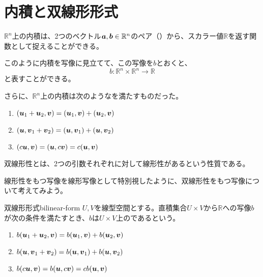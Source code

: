 \documentclass[../../../topic_linear-algebra]{subfiles}
\begin{document}
\sectionline
\section{内積と双線形形式}

$\mathbb{R}^n$上の内積は、2つのベクトル$\vb*{a}, \vb*{b} \in \mathbb{R}^n$のペア（）から、スカラー値$\mathbb{R}$を返す関数として捉えることができる。

このように内積を写像に見立てて、この写像を$b$とおくと、
\begin{equation*}
  b \colon \mathbb{R}^n \times \mathbb{R}^n \to \mathbb{R}
\end{equation*}
と表すことができる。

\br

さらに、$\mathbb{R}^n$上の内積は次のようなを満たすものだった。

\begin{enumerate}[label=\romanlabel]
  \item $(\vb*{u}_1 + \vb*{u}_2, \vb*{v}) = ( \vb*{u}_1, \vb*{v}) + ( \vb*{u}_2, \vb*{v})$
  \item $(\vb*{u}, \vb*{v}_1 + \vb*{v}_2) = (\vb*{u}, \vb*{v}_1) + (\vb*{u}, \vb*{v}_2)$
  \item $(c\vb*{u}, \vb*{v}) = (\vb*{u}, c\vb*{v}) = c(\vb*{u}, \vb*{v})$
\end{enumerate}

双線形性とは、2つの引数それぞれに対して線形性があるという性質である。

線形性をもつ写像を線形写像として特別視したように、双線形性をもつ写像について考えてみよう。

\begin{definition}{双線形形式}{bilinear-form}
  $U,V$を線型空間とする。直積集合$U \times V$から$\mathbb{R}$への写像$b$が次の条件を満たすとき、$b$は$U \times V$上のであるという。
  \begin{enumerate}[label=\romanlabel]
    \item $b(\vb*{u}_1 + \vb*{u}_2, \vb*{v}) = b(\vb*{u}_1, \vb*{v}) + b(\vb*{u}_2, \vb*{v})$
    \item $b(\vb*{u}, \vb*{v}_1 + \vb*{v}_2) = b(\vb*{u}, \vb*{v}_1) + b(\vb*{u}, \vb*{v}_2)$
    \item $b(c\vb*{u}, \vb*{v}) = b(\vb*{u}, c\vb*{v}) = cb(\vb*{u}, \vb*{v})$
  \end{enumerate}
\end{definition}
\end{document}
